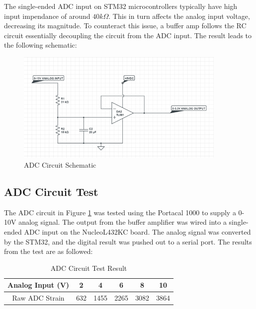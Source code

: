 \documentclass[12pt, a4paper]{article}
\begin{document}
The single-ended ADC input on STM32 microcontrollers typically have high input impendance of around $40k\Omega$. This in turn affects the analog
input voltage, decreasing its magnitude. To counteract this issue, a buffer amp follows the RC circuit essentially decoupling the circuit from the ADC input. The result
leads to the following schematic:
\begin{figure}[H]
    \centering
    \includegraphics[width=0.9\textwidth]{adc_cct.png}
    \caption{ADC Circuit Schematic}
    \label{fig:adc_schem}
\end{figure}
\subsection{ADC Circuit Test}
The ADC circuit in Figure \ref{fig:adc_schem} was tested using the Portacal 1000 to supply a 0-10V analog signal. The output from the buffer
amplifier was wired into a single-ended ADC input on the NucleoL432KC board. The analog signal was converted by the STM32,
and the digital result was pushed out to a serial port. The results from the test are as followed:
\begin{center}
    \begin{table}[h]
        \begin{adjustbox}{width=0.7\textwidth, center=\textwidth}
            \small
            \begin{tabular}{||c c c c c c||}
                \hline
                Analog Input (V) & 2 & 4 & 6 & 8 & 10 \\
                \hline
                Raw ADC Strain & 632 & 1455 & 2265 & 3082 & 3864 \\
                \hline
            \end{tabular}
        \end{adjustbox}
        \caption{ADC Circuit Test Result}
        \label{tab:res3}
    \end{table}
\end{center}
\end{document}
